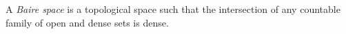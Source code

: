 \documentclass[12pt]{article}
\begin{document}
A \emph{Baire space} is a topological space such that the intersection of any countable family of open and dense sets is dense.
\end{document}
